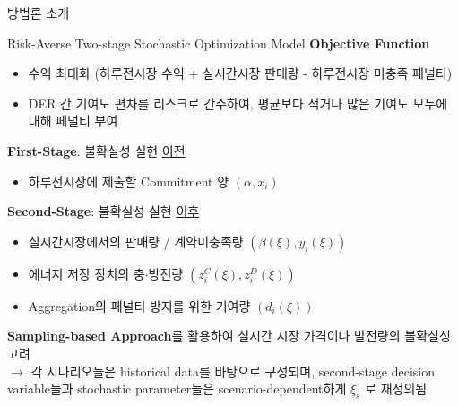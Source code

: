 \documentclass[xcolor=dvipsnames,t,9pt]{beamer}
\begin{document}

\begin{frame}{방법론 소개}
    \begin{block}{Risk-Averse Two-stage Stochastic Optimization Model}
        \textbf{Objective Function} \\
        \begin{itemize}
            \item 수익 최대화 (하루전시장 수익 + 실시간시장 판매량 - 하루전시장 미충족 페널티)
            \item DER 간 기여도 편차를 리스크로 간주하여, 평균보다 적거나 많은 기여도 모두에 대해 페널티 부여
        \end{itemize}
        \textbf{First-Stage}: 불확실성 실현 \underline{이전}
        \begin{itemize}
            \item 하루전시장에 제출할 Commitment 양 $\left( \alpha, x_i \right)$
        \end{itemize}
        \textbf{Second-Stage}: 불확실성 실현 \underline{이후}
        \begin{itemize}
            \item 실시간시장에서의 판매량 / 계약미충족량 $\left( \beta(\xi), y_i(\xi)\right)$
            \item 에너지 저장 장치의 충$\cdot$방전량 $\left(z_i^C(\xi), z_i^D(\xi) \right)$
            \item Aggregation의 페널티 방지를 위한 기여량 $\left( d_i(\xi) \right)$
        \end{itemize}
    \end{block}
    \vspace{0.5em}
    \textbf{Sampling-based Approach}를 활용하여 실시간 시장 가격이나 발전량의 불확실성 고려 \\
    $\rightarrow$ 각 시나리오들은 historical data를 바탕으로 구성되며, second-stage decision
    variable들과 stochastic parameter들은 scenario-dependent하게 $\xi_s$ 로 재정의됨

\end{frame}

\end{document}
